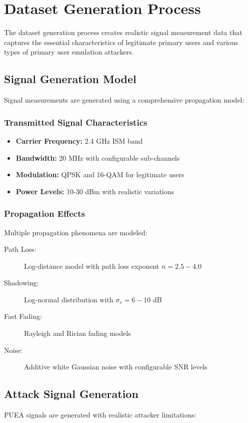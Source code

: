 \section{Dataset Generation Process}
The dataset generation process creates realistic signal measurement data that captures the essential characteristics of legitimate primary users and various types of primary user emulation attackers.

\subsection{Signal Generation Model}
Signal measurements are generated using a comprehensive propagation model:

\subsubsection{Transmitted Signal Characteristics}
\begin{itemize}
\item \textbf{Carrier Frequency:} 2.4 GHz ISM band
\item \textbf{Bandwidth:} 20 MHz with configurable sub-channels
\item \textbf{Modulation:} QPSK and 16-QAM for legitimate users
\item \textbf{Power Levels:} 10-30 dBm with realistic variations
\end{itemize}

\subsubsection{Propagation Effects}
Multiple propagation phenomena are modeled:

\begin{description}
\item[Path Loss:] Log-distance model with path loss exponent $n = 2.5-4.0$
\item[Shadowing:] Log-normal distribution with $\sigma_s = 6-10$ dB
\item[Fast Fading:] Rayleigh and Rician fading models
\item[Noise:] Additive white Gaussian noise with configurable SNR levels
\end{description}

\subsection{Attack Signal Generation}
PUEA signals are generated with realistic attacker limitations:

